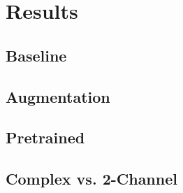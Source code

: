 \chapter{Results}\label{\positionnumber}

\section{Baseline}

\section{Augmentation}

\section{Pretrained}

\section{Complex vs. 2-Channel}




